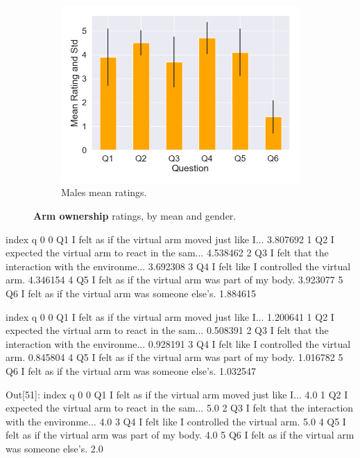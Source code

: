 \begin{figure}[H]
  \hspace{10mm}
 \begin{subfigure}[b]{0.3\textwidth}
 \centering
 \includegraphics[scale=0.33]{Files/Plots/ownership_mean_ratings_m.png}
 \caption{Males mean ratings.}
 \label{fig:ownMale}
 \end{subfigure}
 \caption{\textbf{Arm ownership} ratings, by mean and gender.}
\label{fig:ownAll}
\end{figure}


  index                                                  q         0
0    Q1  I felt as if the virtual arm moved just like I...  3.807692
1    Q2  I expected the virtual arm to react in the sam...  4.538462
2    Q3  I felt that the interaction with the environme...  3.692308
3    Q4          I felt like I controlled the virtual arm.  4.346154
4    Q5  I felt as if the virtual arm was part of my body.  3.923077
5    Q6   I felt as if the virtual arm was someone else’s.  1.884615


  index                                                  q         0
0    Q1  I felt as if the virtual arm moved just like I...  1.200641
1    Q2  I expected the virtual arm to react in the sam...  0.508391
2    Q3  I felt that the interaction with the environme...  0.928191
3    Q4          I felt like I controlled the virtual arm.  0.845804
4    Q5  I felt as if the virtual arm was part of my body.  1.016782
5    Q6   I felt as if the virtual arm was someone else’s.  1.032547



Out[51]: 
  index                                                  q    0
0    Q1  I felt as if the virtual arm moved just like I...  4.0
1    Q2  I expected the virtual arm to react in the sam...  5.0
2    Q3  I felt that the interaction with the environme...  4.0
3    Q4          I felt like I controlled the virtual arm.  5.0
4    Q5  I felt as if the virtual arm was part of my body.  4.0
5    Q6   I felt as if the virtual arm was someone else’s.  2.0



